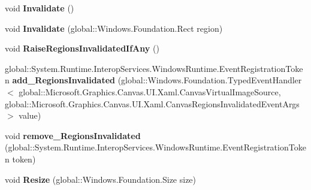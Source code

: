 \begin{DoxyCompactItemize}
void {\bfseries Invalidate} ()
\item 
\mbox{\label{interface_microsoft_1_1_graphics_1_1_canvas_1_1_u_i_1_1_xaml_1_1_i_canvas_virtual_image_source_a8abbf69a507cfa89ef9d4a6b113d2fbb}} 
void {\bfseries Invalidate} (global\+::\+Windows.\+Foundation.\+Rect region)
\item 
\mbox{\label{interface_microsoft_1_1_graphics_1_1_canvas_1_1_u_i_1_1_xaml_1_1_i_canvas_virtual_image_source_a4a0609ae8d5cff634e5c29e0a749f233}} 
void {\bfseries Raise\+Regions\+Invalidated\+If\+Any} ()
\item 
\mbox{\label{interface_microsoft_1_1_graphics_1_1_canvas_1_1_u_i_1_1_xaml_1_1_i_canvas_virtual_image_source_ad46426bf1b7c4443b87a1e998db5c012}} 
global\+::\+System.\+Runtime.\+Interop\+Services.\+Windows\+Runtime.\+Event\+Registration\+Token {\bfseries add\+\_\+\+Regions\+Invalidated} (global\+::\+Windows.\+Foundation.\+Typed\+Event\+Handler$<$ global\+::\+Microsoft.\+Graphics.\+Canvas.\+U\+I.\+Xaml.\+Canvas\+Virtual\+Image\+Source, global\+::\+Microsoft.\+Graphics.\+Canvas.\+U\+I.\+Xaml.\+Canvas\+Regions\+Invalidated\+Event\+Args $>$ value)
\item 
\mbox{\label{interface_microsoft_1_1_graphics_1_1_canvas_1_1_u_i_1_1_xaml_1_1_i_canvas_virtual_image_source_a46e07a464bbb440ccaf5550dea1da55f}} 
void {\bfseries remove\+\_\+\+Regions\+Invalidated} (global\+::\+System.\+Runtime.\+Interop\+Services.\+Windows\+Runtime.\+Event\+Registration\+Token token)
\item 
\mbox{\label{interface_microsoft_1_1_graphics_1_1_canvas_1_1_u_i_1_1_xaml_1_1_i_canvas_virtual_image_source_a09dcc1df360a28aaed847abfaa318e7f}} 
void {\bfseries Resize} (global\+::\+Windows.\+Foundation.\+Size size)
\item 
\mbox{\label{interface_microsoft_1_1_graphics_1_1_canvas_1_1_u_i_1_1_xaml_1_1_i_canvas_virtual_image_source_aeae2edb4ee318d5c8112d6d80769828d}} 

\end{DoxyCompactItemize}
